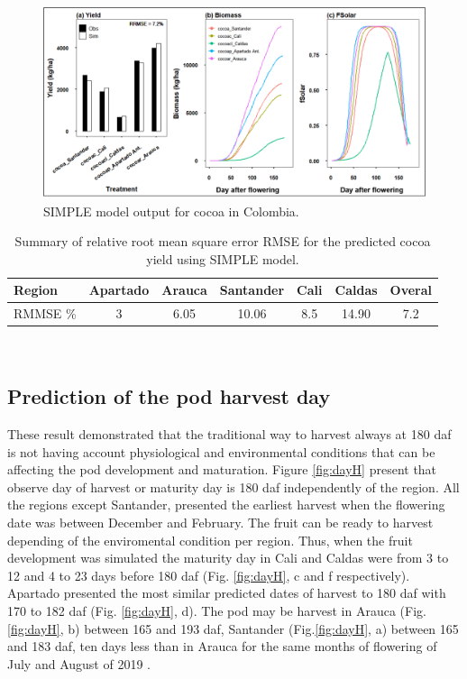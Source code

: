 \documentclass[gene,journal,article,submit,moreauthors,pdftex]{Definitions/mdpi}
\begin{document}
\begin{figure}[h!]
	\centering
	\includegraphics[scale=0.4]{images/outmodel.png}
	\caption{\footnotesize {SIMPLE model output for cocoa in Colombia.\\ }} 
	\label{fig:m1}
\end{figure}

\begin{table}[h!]	
	\caption {\footnotesize {Summary of relative root mean square error RMSE for the predicted cocoa yield using SIMPLE model.}}
	\label{tab:error} 
	\centering
	\begin{small}
		\begin{tabular}{l c c c c c c}
			\hline
			{\bf Region }&{\bf Apartado }&{\bf Arauca}&{\bf Santander}&{\bf Cali}&{\bf Caldas}&{\bf Overal}\\
			\hline
			RMMSE \%  & 3 & 6.05 & 10.06&8.5&14.90&7.2 \\
			\hline
		\end{tabular} \\
	\end{small}
\end{table}


\subsection{Prediction of the pod harvest day }
These result demonstrated that the traditional way to harvest always at 180 daf is not having account physiological and environmental conditions that can be affecting the pod development and maturation.
Figure \ref{fig:dayH} present that observe day of harvest or maturity day is 180 daf independently of the region. All the regions except Santander, presented the earliest harvest when the flowering date was between December and February. The fruit can be ready to harvest depending of the enviromental condition per region. Thus, when the fruit development was simulated the maturity day in Cali and Caldas were from 3 to 12 and 4 to 23 days before 180 daf (Fig. \ref{fig:dayH}, c and f respectively). Apartado presented the most similar predicted dates of harvest to 180 daf with 170 to 182 daf  (Fig. \ref{fig:dayH}, d). The pod may be harvest in Arauca (Fig.\ref{fig:dayH}, b)  between 165 and 193 daf, Santander (Fig.\ref{fig:dayH}, a) between 165 and 183 daf, ten days less than in Arauca for the same months of flowering of July and August of 2019 . 
 
\end{document}
